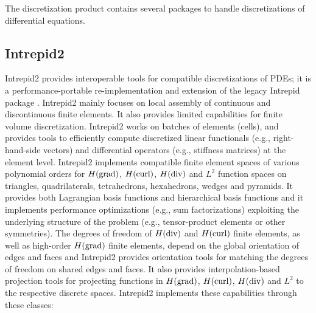 The discretization product contains several packages to handle discretizations of differential equations.

\subsection{Intrepid2}
Intrepid2 provides interoperable tools for compatible discretizations of PDEs; it is a performance-portable re-implementation and extension of the legacy Intrepid package \cite{bochev2012}. Intrepid2 mainly focuses on local assembly of continuous and discontinuous finite elements. It also provides limited capabilities for finite volume discretization.  Intrepid2 works on batches of elements (cells), and provides tools to efficiently compute discretized linear functionals (e.g., right-hand-side vectors) and differential operators (e.g., stiffness matrices) at the element level. Intrepid2 implements compatible finite element spaces of various polynomial orders for $H({\rm grad})$, $H({\rm curl})$, $H({\rm div})$ and $L^2$ function spaces on triangles, quadrilaterals, tetrahedrons, hexahedrons, wedges and pyramids. It provides both Lagrangian basis functions and hierarchical basis functions \cite{fuentes2015} and it implements performance optimizations (e.g., sum factorizations) exploiting the underlying structure of the problem (e.g., tensor-product elements or other symmetries).  The degrees of freedom of $H({\rm div})$ and $H({\rm curl})$ finite elements, as well as high-order $H({\rm grad})$ finite elements, depend on the global orientation of edges and faces and Intrepid2 provides orientation tools for matching the degrees of freedom on shared edges and faces. It also provides interpolation-based projection tools for projecting functions in $H({\rm grad})$, $H({\rm curl})$, $H({\rm div})$ and $L^2$ to the respective discrete spaces. Intrepid2 implements these capabilities through these classes:
